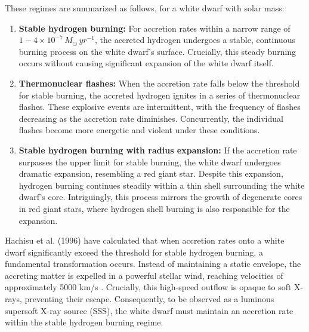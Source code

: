         	These regimes are summarized as follows, for a white dwarf with solar mass:        	
        	\begin{enumerate}
				\item \textbf{Stable hydrogen burning:} For accretion rates within a narrow range of $1-4\times 10^{-7}\,M_{\odot}\,yr^{-1}$, the accreted hydrogen undergoes a stable, continuous burning process on the white dwarf's surface. Crucially, this steady burning occurs without causing significant expansion of the white dwarf itself.
				\item \textbf{Thermonuclear flashes:} When the accretion rate falls below the threshold for stable burning, the accreted hydrogen ignites in a series of thermonuclear flashes. These explosive events are intermittent, with the frequency of flashes decreasing as the accretion rate diminishes. Concurrently, the individual flashes become more energetic and violent under these conditions.
				\item \textbf{Stable hydrogen burning with radius expansion:} If the accretion rate surpasses the upper limit for stable burning, the white dwarf undergoes dramatic expansion, resembling a red giant star. Despite this expansion, hydrogen burning continues steadily within a thin shell surrounding the white dwarf's core. Intriguingly, this process mirrors the growth of degenerate cores in red giant stars, where hydrogen shell burning is also responsible for the expansion.
			\end{enumerate}
			
			Hachisu et al. (1996) have calculated that when accretion rates onto a white dwarf significantly exceed the threshold for stable hydrogen burning, a fundamental transformation occurs. Instead of maintaining a static envelope, the accreting matter is expelled in a powerful stellar wind, reaching velocities of approximately 5000 km/s \cite{hachisu96}. Crucially, this high-speed outflow is opaque to soft X-rays, preventing their escape. Consequently, to be observed as a luminous supersoft X-ray source (SSS), the white dwarf must maintain an accretion rate within the stable hydrogen burning regime.
			

